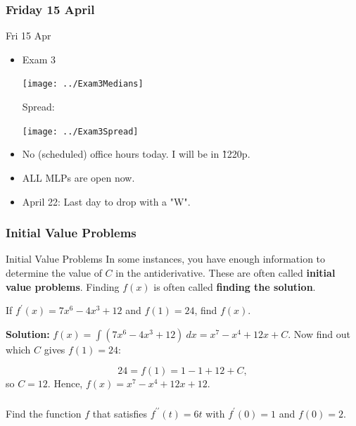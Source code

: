 \documentclass[cal1spr16Lectures.tex]{subfiles}
\begin{document}

\subsubsection{\bf Friday 15 April}

\begin{frame}[allowframebreaks]{Fri 15 Apr}
\begin{itemize}\footnotesize
\item Exam 3

\texttt{[image: ../Exam3Medians]}

Spread:

\begin{center}
\texttt{[image: ../Exam3Spread]}
\end{center}
\item No (scheduled) office hours today.  I will be in \~1220p.
\item ALL MLPs are open now.
\item April 22: Last day to drop with a "W".
\end{itemize}
\end{frame}

\subsubsection{Initial Value Problems}

\begin{frame}{\small Initial Value Problems}\footnotesize
In some instances, you have enough information to determine the value of $C$ in the antiderivative.  These are often called {\bf initial value problems}.  Finding $f(x)$ is often called {\bf finding the solution}.

\begin{ex} 
If $f^{\prime}(x)=7x^6-4x^3+12$ and $f(1)=24$, find $f(x)$. 
\end{ex} 
{\bf Solution:}  $f(x)=\int (7x^6-4x^3+12)\ dx = x^7 - x^4 + 12x + C$.  Now find out which $C$ gives $f(1)=24$:

\vspace{-0.5pc}
\[24=f(1)=1-1+12+C,\] 
so $C=12$.  Hence, \alert{$f(x)=x^7 - x^4 + 12x + 12$}.
\end{frame}

\begin{frame}%
\frametitle{}
\begin{exe} Find the function $f$ that satisfies $f^{\prime\prime}(t)=6t$ with $f^{\prime}(0)=1$ and $f(0)=2$. \end{exe}
\end{frame}
\end{document}
